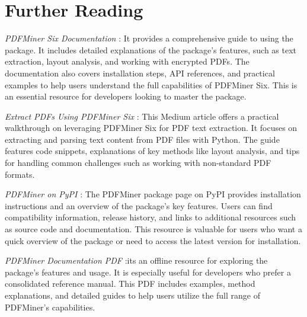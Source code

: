 \section{Further Reading} 

\textit{PDFMiner Six Documentation} \cite{Shinyama:2019}: It provides a comprehensive guide to using the package. It includes detailed explanations of the package's features, such as text extraction, layout analysis, and working with encrypted PDFs. The documentation also covers installation steps, API references, and practical examples to help users understand the full capabilities of PDFMiner Six. This is an essential resource for developers looking to master the package.

\textit{Extract PDFs Using PDFMiner Six} \cite{MB20261:2023}: This Medium article offers a practical walkthrough on leveraging PDFMiner Six for PDF text extraction. It focuses on extracting and parsing text content from PDF files with Python. The guide features code snippets, explanations of key methods like layout analysis, and tips for handling common challenges such as working with non-standard PDF formats. 

\textit{PDFMiner on PyPI} \cite{Python:2024Pdfminer}: The PDFMiner package page on PyPI provides installation instructions and an overview of the package’s key features. Users can find compatibility information, release history, and links to additional resources such as source code and documentation. This resource is valuable for users who want a quick overview of the package or need to access the latest version for installation.

\textit{PDFMiner Documentation PDF} \cite{Shinyama:2017}:its an offline resource for exploring the package's features and usage. It is especially useful for developers who prefer a consolidated reference manual. This PDF includes examples, method explanations, and detailed guides to help users utilize the full range of PDFMiner's capabilities.